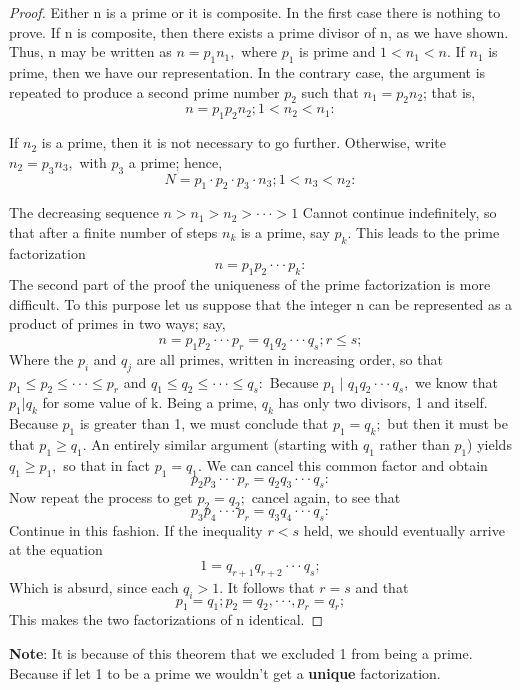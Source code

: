 \documentclass[a4paper,draft]{amsproc}
\theoremstyle{plain}
\theoremstyle{definition}
\theoremstyle{remark}
\numberwithin{equation}{section}
\begin{document}
\begin{proof}
Either n is a prime or it is composite. In the first case there is nothing to prove. If n is composite, then there exists a prime divisor of n, as we have shown. Thus, n may be written as $n=p_1n_1,$ where $p_1$ is prime and $1<n_1<n.$ If $n_1$ is prime, then we have our representation. In the contrary case, the argument is repeated to produce a second prime number $p_2$ such that $n_1=p_2n_2$; that is,
$$
n=p_1p_2n_2; 1<n_2<n_1:
$$

 If $n_2$ is a prime, then it is not necessary to go further. Otherwise, write\\ $n_2=p_3n_3,$ with $p_3$ a prime; hence,
$$
N=p_1\cdot p_2\cdot p_3\cdot n_3; 1<n_3<n_2:
$$

The decreasing sequence
$n>n_1>n_2>\cdot\cdot\cdot >1$
Cannot continue indefinitely, so that after a finite number of steps $n_k$ is a prime, say $p_k$. This leads to the prime factorization
$$n=p_1 p_2\cdot\cdot\cdot p_k:$$
The second part of the proof the uniqueness of the prime factorization is more difficult. To this purpose let us suppose that the integer n can be represented as a product of primes in two ways; say,
$$n=p_1 p_2\cdot\cdot\cdot p_r=q_1q_2\cdot\cdot\cdot q_s; r\leq s;$$
Where the $p_i$ and $q_j$ are all primes, written in increasing order, so that
$ p_1\leq p_2 \leq\cdot\cdot\cdot\leq p_r$ and $q_1\leq q_2 \leq\cdot\cdot\cdot\leq q_s:$
Because $p_1\mid q_1q_2\cdot\cdot\cdot q_s,$ we know that $p_1|q_k$ for some value of k. Being a prime, $q_k$ has only two divisors, 1 and itself. Because $p_1$ is greater than 1, we must conclude that $p_1=q_k;$ but then it must be that $p_1\geq q_1.$ An entirely similar argument (starting with $q_1$ rather than $p_1$) yields $q_1\geq p_1,$ so that in fact $p_1=q_1.$ We can cancel this common factor and obtain
$$
p_2 p_3\cdot\cdot\cdot p_r=q_2q_3\cdot\cdot\cdot q_s:
$$
Now repeat the process to get $p_2=q_2;$ cancel again, to see that
$$
p_3 p_4\cdot\cdot\cdot p_r=q_3q_4\cdot\cdot\cdot q_s:
$$
Continue in this fashion. If the inequality $r <s$ held, we should eventually arrive at the equation
$$1=q_{r+1}q_{r+2}\cdot\cdot\cdot q_s;$$
Which is absurd, since each $q_i >1.$ It follows that $r=s$ and that
$$
p_1=q_1;p_2=q_2,\cdot\cdot\cdot , p_r=q_r;
$$
This makes the two factorizations of n identical.
\end{proof}

\textbf{Note}: It is because of this theorem that we excluded 1 from being a prime. Because if let 1 to be  a prime we wouldn't get a \textbf{unique} factorization.
\end{document}

